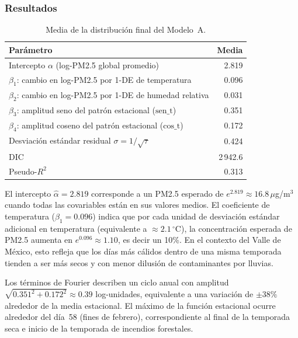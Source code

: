 \documentclass[12pt]{article}
\begin{document}
\subsubsection*{Resultados}

\begin{table}[H]
\centering
\caption{Media de la distribuci\'on final del Modelo~A.}
\label{tab:modA}
\begin{tabular}{>{\raggedright\arraybackslash}p{8.5cm}r}
\toprule
Par\'ametro & Media \\
\midrule
Intercepto $\alpha$ (log-PM2.5 global promedio)               &  2.819 \\
$\beta_1$: cambio en log-PM2.5 por 1-DE de temperatura       &  0.096 \\
$\beta_2$: cambio en log-PM2.5 por 1-DE de humedad relativa  &  0.031 \\
$\beta_3$: amplitud seno del patr\'on estacional ($\text{sen\_t}$) & 0.351 \\
$\beta_4$: amplitud coseno del patr\'on estacional ($\text{cos\_t}$) & 0.172 \\
Desviaci\'on est\'andar residual $\sigma = 1/\sqrt{\tau}$     &  0.424 \\
\midrule
DIC                                                            & 2\,942.6 \\
Pseudo-$R^2$                                                   & 0.313 \\
\bottomrule
\end{tabular}
\end{table}

El intercepto $\hat\alpha = 2.819$ corresponde a un PM2.5 esperado de
$e^{2.819} \approx 16.8\,\mu$g/m$^3$ cuando todas las covariables est\'an
en sus valores medios.
El coeficiente de temperatura ($\hat\beta_1 = 0.096$) indica que por cada
unidad de desviaci\'on est\'andar adicional en temperatura
(equivalente a $\approx 2.1\,^\circ$C), la concentraci\'on esperada de
PM2.5 aumenta en $e^{0.096} \approx 1.10$, es decir un 10\%.
En el contexto del Valle de M\'exico, esto refleja que los d\'ias m\'as
c\'alidos dentro de una misma temporada tienden a ser m\'as secos y con
menor dilusi\'on de contaminantes por lluvias.

Los t\'erminos de Fourier describen un ciclo anual con amplitud
$\sqrt{0.351^2 + 0.172^2} \approx 0.39$ log-unidades, equivalente
a una variaci\'on de $\pm 38\%$ alrededor de la media estacional.
El m\'aximo de la funci\'on estacional ocurre alrededor del d\'ia~58
(fines de febrero), correspondiente al final de la temporada seca e
inicio de la temporada de incendios forestales.
\end{document}
